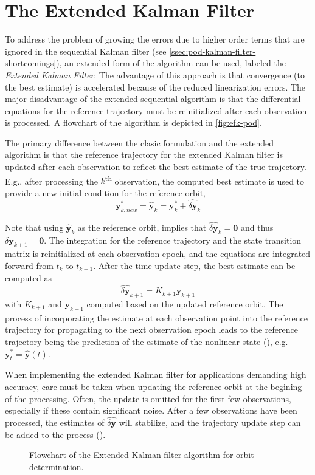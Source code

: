 \section{The Extended Kalman Filter}\label{sec:pod-extended-kalman-filter}

To address the problem of growing the errors due to higher order terms that are 
ignored in the sequential Kalman filter (see \autoref{ssec:pod-kalman-filter-shortcomings}), 
an extended form of the algorithm can be used, labeled the \emph{Extended Kalman Filter}.
The advantage of this approach is that convergence (to the best estimate) is 
accelerated because of the reduced linearization errors. The major disadvantage 
of the extended sequential algorithm is that the differential equations for the 
reference trajectory must be reinitialized after each observation is processed.
A flowchart of the algorithm is depicted in \autoref{fig:efk-pod}.

The primary difference between the clasic formulation and the extended algorithm 
is that the reference trajectory for the extended Kalman filter is updated 
after each observation to reflect the best estimate of the true trajectory. E.g., 
after processing the $k$\textsuperscript{th} observation, the computed best estimate 
is used to provide a new initial condition for the reference orbit,
\begin{equation}\label{eq:tapley4728}
    \bm{y}^{*}_{k, new} = \hat{\bm{y}}_k = \bm{y}^{*}_k + \hat{\delta \bm{y}}_k
\end{equation}

Note that using $\hat{\bm{y}}_k$ as the reference orbit, implies that $\hat{\delta \bm{y}}_k=\bm{0}$ 
and thus $\bar{\delta \bm{y}}_{k+1}=\bm{0}$. The integration for the reference 
trajectory and the state transition matrix is reinitialized at each observation 
epoch, and the equations are integrated forward from $t_k$ to $t_{k+1}$. After 
the time update step, the best estimate can be computed as 
\begin{equation}
    \hat{\delta \bm{y}}_{k+1} = K_{k+1} \bm{y}_{k+1}
\end{equation}
with $K_{k+1}$ and $\bm{y}_{k+1}$ computed based on the updated reference orbit.
The process of incorporating the estimate at each observation point into the 
reference trajectory for propagating to the next observation epoch leads to
the reference trajectory being the prediction of the estimate of the nonlinear state 
(\cite{Tapley2004}), e.g. $\bm{y}^{*}_{t} = \hat{\bm{y}}(t)$.

When implementing the extended Kalman filter for applications demanding high accuracy, 
care must be taken when updating the reference orbit at the begining of the 
processing. Often, the update is omitted for the first few observations, especially 
if these contain significant noise. After a few observations have been processed, 
the estimates of $\hat{\delta \bm{y}}$ will stabilize, and the trajectory update step 
can be added to the process (\cite{Tapley2004}).

\begin{figure}
    \centering
    
    \caption{Flowchart of the Extended Kalman filter algorithm for orbit determination.}
    \label{fig:efk-pod}
\end{figure}